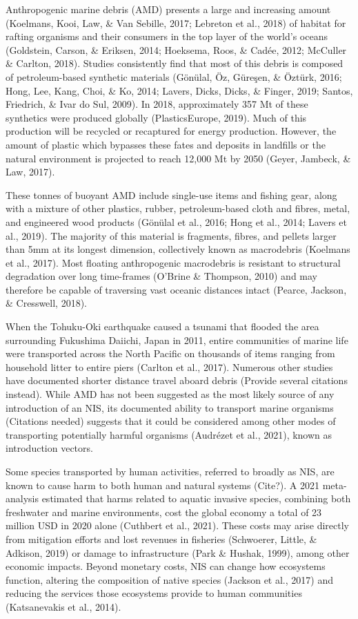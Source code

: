 \documentclass[a4paper, nobind]{templates/ociamthesis}
\begin{document}
Anthropogenic marine debris (AMD) presents a large and increasing amount (Koelmans, Kooi, Law, \& Van Sebille, 2017; Lebreton et al., 2018) of habitat for rafting organisms and their consumers in the top layer of the world's oceans (Goldstein, Carson, \& Eriksen, 2014; Hoeksema, Roos, \& Cadée, 2012; McCuller \& Carlton, 2018). Studies consistently find that most of this debris is composed of petroleum-based synthetic materials (Gönülal, Öz, Güreşen, \& Öztürk, 2016; Hong, Lee, Kang, Choi, \& Ko, 2014; Lavers, Dicks, Dicks, \& Finger, 2019; Santos, Friedrich, \& Ivar do Sul, 2009). In 2018, approximately 357 Mt of these synthetics were produced globally (PlasticsEurope, 2019). Much of this production will be recycled or recaptured for energy production. However, the amount of plastic which bypasses these fates and deposits in landfills or the natural environment is projected to reach 12,000 Mt by 2050 (Geyer, Jambeck, \& Law, 2017).

These tonnes of buoyant AMD include single-use items and fishing gear, along with a mixture of other plastics, rubber, petroleum-based cloth and fibres, metal, and engineered wood products (Gönülal et al., 2016; Hong et al., 2014; Lavers et al., 2019). The majority of this material is fragments, fibres, and pellets larger than 5mm at its longest dimension, collectively known as macrodebris (Koelmans et al., 2017). Most floating anthropogenic macrodebris is resistant to structural degradation over long time-frames (O'Brine \& Thompson, 2010) and may therefore be capable of traversing vast oceanic distances intact (Pearce, Jackson, \& Cresswell, 2018).

When the Tohuku-Oki earthquake caused a tsunami that flooded the area surrounding Fukushima Daiichi, Japan in 2011, entire communities of marine life were transported across the North Pacific on thousands of items ranging from household litter to entire piers (Carlton et al., 2017). Numerous other studies have documented shorter distance travel aboard debris (Provide several citations instead). While AMD has not been suggested as the most likely source of any introduction of an NIS, its documented ability to transport marine organisms (Citations needed) suggests that it could be considered among other modes of transporting potentially harmful organisms (Audrézet et al., 2021), known as introduction vectors.

Some species transported by human activities, referred to broadly as NIS, are known to cause harm to both human and natural systems (Cite?). A 2021 meta-analysis estimated that harms related to aquatic invasive species, combining both freshwater and marine environments, cost the global economy a total of 23 million USD in 2020 alone (Cuthbert et al., 2021). These costs may arise directly from mitigation efforts and lost revenues in fisheries (Schwoerer, Little, \& Adkison, 2019) or damage to infrastructure (Park \& Hushak, 1999), among other economic impacts. Beyond monetary costs, NIS can change how ecosystems function, altering the composition of native species (Jackson et al., 2017) and reducing the services those ecosystems provide to human communities (Katsanevakis et al., 2014).
\end{document}
